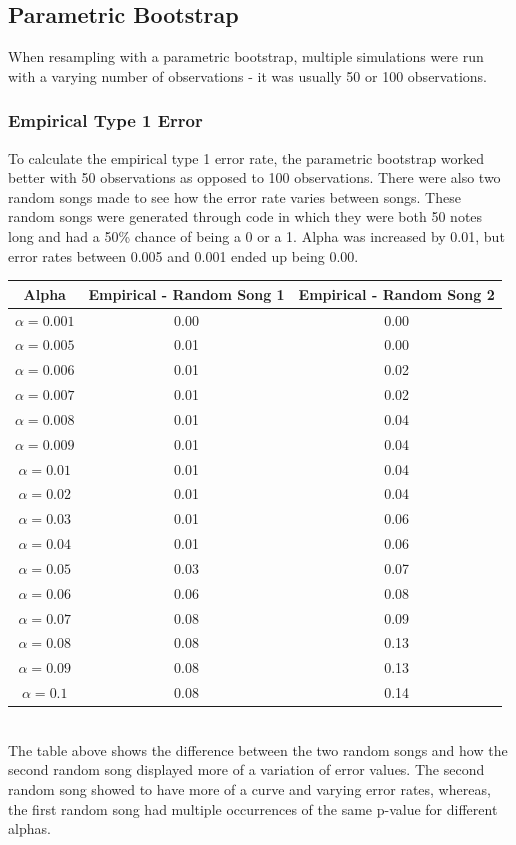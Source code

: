 \documentclass[12pt, letterpaper]{article}
\begin{document}
\subsection{Parametric Bootstrap}
When resampling with a parametric bootstrap, multiple simulations were run with a varying number of observations - it was usually 50 or 100 observations.  

\subsubsection{Empirical Type 1 Error} 
To calculate the empirical type 1 error rate, the parametric bootstrap worked better with 50 observations as opposed to 100 observations.  There were also two random songs made to see how the error rate varies between songs.  These random songs were generated through code in which they were both 50 notes long and had a 50\% chance of being a 0 or a 1.  Alpha was increased by 0.01, but error rates between 0.005 and 0.001 ended up being 0.00. 

\begin{tabular}{|c|c|c|}
\hline
\textbf{Alpha} & \textbf{Empirical - Random Song 1} & \textbf{Empirical - Random Song 2} \\
\hline
$\alpha = 0.001$ & 0.00 & 0.00\\
$\alpha = 0.005$ &  0.01 & 0.00\\
$\alpha = 0.006$ &  0.01 & 0.02\\
$\alpha = 0.007$ & 0.01 & 0.02\\
$\alpha = 0.008$ & 0.01 & 0.04\\
$\alpha = 0.009$ & 0.01 & 0.04\\
$\alpha = 0.01$ & 0.01 & 0.04\\
$\alpha = 0.02$ & 0.01 & 0.04\\
$\alpha = 0.03$ & 0.01 & 0.06\\
$\alpha = 0.04$ & 0.01 & 0.06\\
$\alpha = 0.05$ &  0.03 & 0.07\\
$\alpha = 0.06$ &  0.06 & 0.08\\
$\alpha = 0.07$ &  0.08 & 0.09\\
$\alpha = 0.08$ &  0.08 & 0.13\\
$\alpha = 0.09$ & 0.08 & 0.13\\
$\alpha = 0.1$ & 0.08 & 0.14\\
\hline
\end{tabular} \\

The table above shows the difference between the two random songs and how the second random song displayed more of a variation of error values.  The second random song showed to have more of a curve and varying error rates, whereas, the first random song had multiple occurrences of the same p-value for different alphas. 
\end{document}
